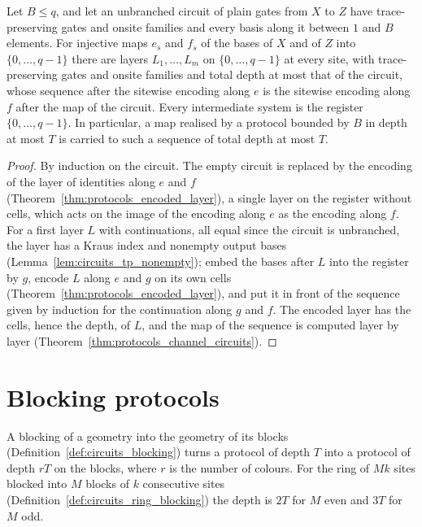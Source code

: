\begin{theorem}
    \label{thm:protocols_fixed_register}
    \leanok
    Let $B\le q$, and let an unbranched circuit of plain gates from $X$ to $Z$ have
    trace-preserving gates and onsite families and every basis along it between $1$ and $B$
    elements. For injective maps $e_s$ and $f_s$ of the bases of $X$ and of $Z$ into
    $\{0,\dots,q-1\}$ there are layers $L_1,\dots,L_m$ on $\{0,\dots,q-1\}$ at every site, with
    trace-preserving gates and onsite families and total depth at most that of the circuit,
    whose sequence after the sitewise encoding along $e$ is the sitewise encoding along $f$
    after the map of the circuit. Every intermediate system is the register
    $\{0,\dots,q-1\}$. In particular, a map realised by a protocol bounded by $B$ in depth at
    most $T$ is carried to such a sequence of total depth at most $T$.
\end{theorem}
\begin{proof}\leanok
    By induction on the circuit. The empty circuit is replaced by the encoding of the layer of
    identities along $e$ and $f$ (Theorem~\ref{thm:protocols_encoded_layer}), a single layer on
    the register without cells, which acts on the image of the encoding along $e$ as the
    encoding along $f$. For a first layer $L$ with continuations, all equal since the circuit is
    unbranched, the layer has a Kraus index and nonempty output bases
    (Lemma~\ref{lem:circuits_tp_nonempty}); embed the bases after $L$ into the register by $g$,
    encode $L$ along $e$ and $g$ on its own cells (Theorem~\ref{thm:protocols_encoded_layer}),
    and put it in front of the sequence given by induction for the continuation along $g$ and
    $f$. The encoded layer has the cells, hence the depth, of $L$, and the map of the sequence
    is computed layer by layer (Theorem~\ref{thm:protocols_channel_circuits}).
\end{proof}

\section{Blocking protocols}
\label{sec:protocols_block}

A blocking of a geometry into the geometry of its blocks
(Definition~\ref{def:circuits_blocking}) turns a protocol of depth $T$ into a protocol of
depth $rT$ on the blocks, where $r$ is the number of colours. For the ring of $Mk$ sites
blocked into $M$ blocks of $k$ consecutive sites (Definition~\ref{def:circuits_ring_blocking})
the depth is $2T$ for $M$ even and $3T$ for $M$ odd.

